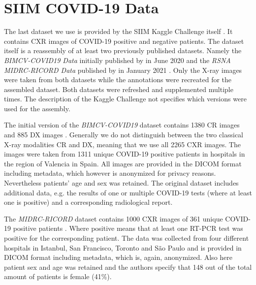\section{SIIM COVID-19 Data}\label{data:siim}

The last dataset we use is provided by the SIIM Kaggle Challenge itself \autocite{SIIMKaggle}. It contains \ac{CXR} images of COVID-19 positive and negative patients. The dataset itself is a reassembly of at least two previously published datasets. Namely the \textit{BIMCV-COVID19 Data} initially published by \citeauthor{vaya2020bimcv} in June 2020 \autocite{vaya2020bimcv} and the \textit{RSNA MIDRC-RICORD Data} published by \citeauthor{tsai2021rsna} in January 2021 \autocite{tsai2021rsna}. Only the X-ray images were taken from both datasets while the annotations were recreated for the assembled dataset. Both datasets were refreshed and supplemented multiple times. The description of the Kaggle Challenge not specifies which versions were used for the assembly.

The initial version of the \textit{BIMCV-COVID19} dataset contains \num{1380} CR images and \num{885} DX images \autocite{vaya2020bimcv}. Generally we do not distinguish between the two classical X-ray modalities CR and DX, meaning that we use all \num{2265} \ac{CXR} images. The images were taken from \num{1311} unique COVID-19 positive patients in hospitals in the region of Valencia in Spain. All images are provided in the DICOM format including metadata, which however is anonymized for privacy reasons. Nevertheless patients' age and sex was retained. The original dataset includes additional data, e.g. the results of one or multiple COVID-19 tests (where at least one is positive) and a corresponding radiological report.

The \textit{MIDRC-RICORD} dataset contains \num{1000} CXR images of \num{361} unique COVID-19 positive patients \autocite{tsai2021rsna}. Where positive means that at least one \ac{RT-PCR} test was positive for the corresponding patient. The data was collected from four different hospitals in Istanbul, San Francisco, Toronto and São Paulo and is provided in DICOM format including metadata, which is, again, anonymized. Also here patient sex and age was retained and the authors specify that 148 out of the total amount of patients is female (41\%).

